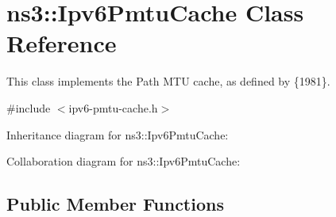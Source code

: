 \hypertarget{classns3_1_1Ipv6PmtuCache}{}\section{ns3\+:\+:Ipv6\+Pmtu\+Cache Class Reference}
\label{classns3_1_1Ipv6PmtuCache}


This class implements the Path M\+TU cache, as defined by \{1981\}.  




{\ttfamily \#include $<$ipv6-\/pmtu-\/cache.\+h$>$}



Inheritance diagram for ns3\+:\+:Ipv6\+Pmtu\+Cache\+:


Collaboration diagram for ns3\+:\+:Ipv6\+Pmtu\+Cache\+:
\subsection*{Public Member Functions}
